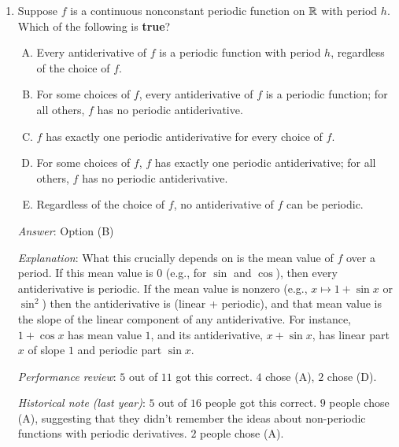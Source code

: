 \documentclass[10pt]{amsart}
\begin{document}
\begin{enumerate}
  {\em Answer}: Option (A)

  {\em Explanation}: Fill this in yourself; it is similar to the
  previous exercise. Note that the key difference here is that an even
  function does not have to be $0$ at $0$, and adding a constant
  preserves the property of being even.

  {\em Performance review}: $10$ out of $11$ got this correct. $1$
  chose (E).

  {\em Historical note (last year)}: $13$ out of $16$ people got this
  correct. $1$ person each chose (B), (C), and (D).

\item Suppose $f$ is a continuous nonconstant periodic function on
  $\mathbb{R}$ with period $h$. Which of the following is {\bf true}?

  \begin{enumerate}[(A)]
  \item Every antiderivative of $f$ is a periodic function with period
    $h$, regardless of the choice of $f$.
  \item For some choices of $f$, every antiderivative of $f$ is a
    periodic function; for all others, $f$ has no periodic antiderivative.
  \item $f$ has exactly one periodic antiderivative for every choice of $f$.
  \item For some choices of $f$, $f$ has exactly one periodic
    antiderivative; for all others, $f$ has no periodic
    antiderivative.
  \item Regardless of the choice of $f$, no antiderivative of $f$ can
    be periodic.
  \end{enumerate}

  {\em Answer}: Option (B)

  {\em Explanation}: What this crucially depends on is the mean value
  of $f$ over a period. If this mean value is $0$ (e.g., for $\sin$
  and $\cos$), then every antiderivative is periodic. If the mean
  value is nonzero (e.g., $x \mapsto 1 + \sin x$ or $\sin^2$) then the
  antiderivative is (linear + periodic), and that mean value is the
  slope of the linear component of any antiderivative. For instance,
  $1 + \cos x$ has mean value $1$, and its antiderivative, $x + \sin
  x$, has linear part $x$ of slope $1$ and periodic part $\sin x$.

  {\em Performance review}: $5$ out of $11$ got this correct. $4$
  chose (A), $2$ chose (D).

 {\em Historical note (last year)}: $5$ out of $16$ people
  got this correct. $9$ people chose (A), suggesting that they didn't
  remember the ideas about non-periodic functions with periodic
  derivatives. $2$ people chose (A).
  

\end{enumerate}
\end{document}
